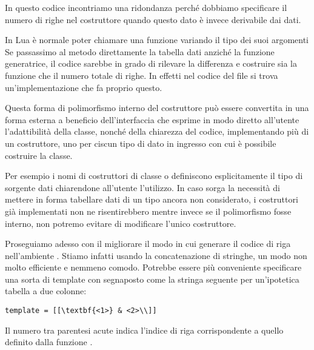 In questo codice incontriamo una ridondanza perché dobbiamo specificare il
numero di righe nel costruttore  quando questo dato è invece derivabile
dai dati. 

In Lua è normale poter chiamare una funzione variando il tipo dei suoi argomenti
Se passassimo al metodo  direttamente la tabella dati anziché la
funzione generatrice, il codice sarebbe in grado di rilevare la differenza e
costruire sia la funzione  che il numero totale di righe. In
effetti nel codice del file  si trova un'implementazione
che fa proprio questo.

Questa forma di polimorfismo interno del costruttore può essere convertita in
una forma esterna a beneficio dell'interfaccia che esprime in modo diretto
all'utente l'adattibilità della classe, nonché della chiarezza del codice,
implementando più di un costruttore, uno per ciscun tipo di dato in ingresso con
cui è possibile costruire la classe.

Per esempio i nomi di costruttori di classe  o 
definiscono esplicitamente il tipo di sorgente dati chiarendone all'utente
l'utilizzo. In caso sorga la necessità di mettere in forma tabellare dati di un
tipo ancora non considerato, i costruttori già implementati non ne
risentirebbero mentre invece se il polimorfismo fosse interno, non potremo
evitare di modificare l'unico costruttore.

Proseguiamo adesso con il migliorare il modo in cui generare il codice di riga
nell'ambiente . Stiamo infatti usando la concatenazione di
stringhe, un modo non molto efficiente e nemmeno comodo. Potrebbe essere più
conveniente specificare una sorta di template con segnaposto come la stringa
seguente per un'ipotetica tabella a due colonne:
\begin{Verbatim}[numbers=none]
template = [[\textbf{<1>} & <2>\\]]
\end{Verbatim}

Il numero tra parentesi acute \code{<>} indica l'indice di riga corrispondente a
quello definito dalla funzione .

